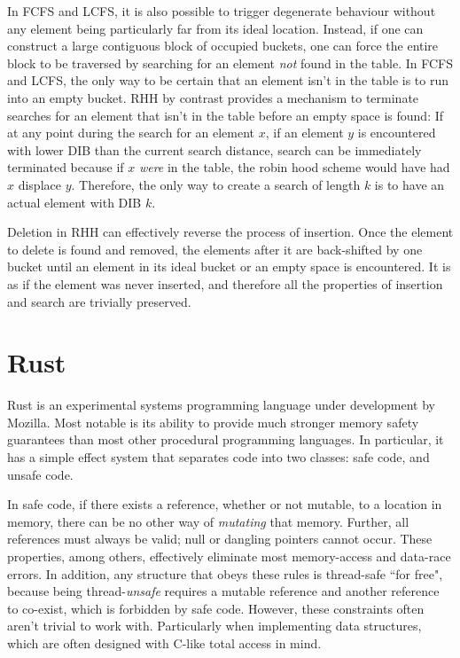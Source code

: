 \documentclass{cccg13}
\begin{document}
In FCFS and LCFS, it is also possible to trigger degenerate behaviour without
any element being particularly far from its ideal location. Instead, if one
can construct a large contiguous block of occupied buckets, one can force the
entire block to be traversed by searching for an element \emph{not} found in
the table. In FCFS and LCFS, the only way to be certain that an element isn't
in the table is to run into an empty bucket. RHH by contrast provides a
mechanism to terminate searches for an element that isn't in the table before
an empty space is found: If at any point during the search for an element $x$,
if an element $y$ is encountered with lower DIB than the current search
distance, search can be immediately terminated because if $x$ \emph{were} in
the table, the robin hood scheme would have had $x$ displace $y$. Therefore,
the only way to create a search of length $k$ is to have an actual element
with DIB $k$.

Deletion in RHH can effectively reverse the process of insertion. Once the
element to delete is found and removed, the elements after it are back-shifted
by one bucket until an element in its ideal bucket or an empty space is
encountered. It is as if the element was never inserted, and therefore all the
properties of insertion and search are trivially preserved.





\section{Rust}

Rust is an experimental systems programming language under development by
Mozilla. Most notable is its ability to provide much stronger memory safety
guarantees than most other procedural programming languages. In particular, it
has a simple effect system that separates code into two classes: safe code,
and unsafe code.

In safe code, if there exists a reference, whether or not mutable, to a
location in memory, there can be no other way of \emph{mutating} that memory.
Further, all references must
always be valid; null or dangling pointers cannot occur. These properties,
among others, effectively eliminate most memory-access and data-race errors.
In addition, any structure that obeys these rules is thread-safe ``for free",
because being thread-\emph{unsafe} requires a mutable reference and another
reference to co-exist, which is forbidden by safe code. However, these
constraints often aren't trivial to work with. Particularly when implementing
data structures, which are often designed with C-like total access in mind.
\end{document}
